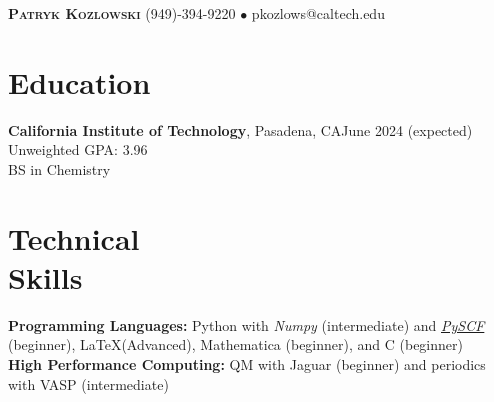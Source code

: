 \documentclass[margin,line]{resume}
\begin{document}
{\Large \textbf{\scshape Patryk Kozlowski}
\normalsize
\hspace{70mm}(949)-394-9220 $\bullet$ pkozlows@caltech.edu
}
\begin{resume}

\section{\mysidestyle Education}
\textbf{California Institute of Technology}, Pasadena, CA\hfill June 2024 (expected)\\
Unweighted GPA: 3.96\\
BS in Chemistry

\section{\mysidestyle Technical\\ Skills}
\textbf{Programming Languages:} Python with \emph{Numpy} (intermediate) 
and \emph{\href{https://pyscf.org/}{PySCF}} (beginner), \LaTeX  (Advanced), Mathematica (beginner), and C (beginner)\\
\textbf{High Performance Computing:} QM with Jaguar (beginner) and periodics with VASP (intermediate)


\end{resume}
\end{document}
